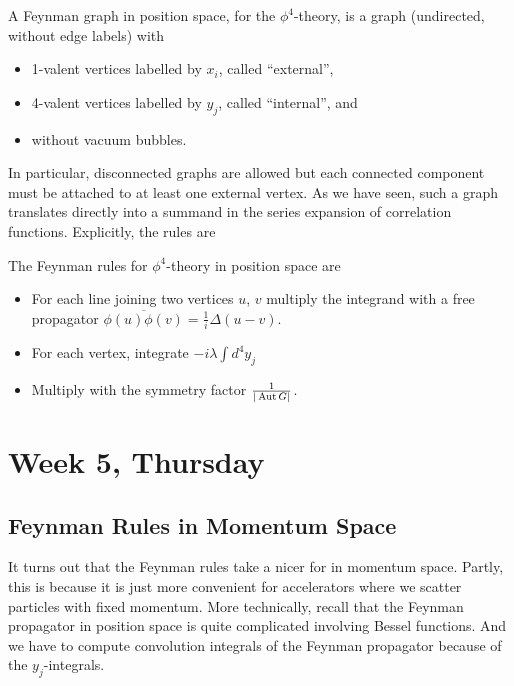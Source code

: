 \begin{definition}
  A Feynman graph in position space, for the $\phi^4$-theory, is a
  graph (undirected, without edge labels) with
  \begin{itemize}
  \item 1-valent vertices labelled by $x_i$, called ``external'',
  \item 4-valent vertices labelled by $y_j$, called ``internal'', and
  \item without vacuum bubbles.
  \end{itemize}
\end{definition}
In particular, disconnected graphs are allowed but each connected
component must be attached to at least one external vertex. As we have
seen, such a graph translates directly into a summand in the series
expansion of correlation functions. Explicitly, the rules are
\begin{definition}
  The Feynman rules for $\phi^4$-theory in position space are
  \begin{itemize}
  \item For each line joining two vertices $u$, $v$ multiply the
    integrand with a free propagator $\overline{\phi(u)\phi(v)} =
    \frac{1}{i} \Delta(u-v)$.
  \item For each vertex, integrate $-i\lambda \int d^4y_j$
  \item Multiply with the symmetry factor $\frac{1}{|\operatorname{Aut} G|}$.
  \end{itemize}
\end{definition}



\section{Week 5, Thursday}

\subsection{Feynman Rules in Momentum Space}

It turns out that the Feynman rules take a nicer for in momentum
space. Partly, this is because it is just more convenient for
accelerators where we scatter particles with fixed momentum. More
technically, recall that the Feynman propagator in position space is
quite complicated involving Bessel functions. And we have to compute
convolution integrals of the Feynman propagator because of the
$y_j$-integrals.


